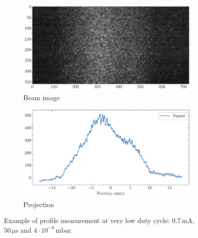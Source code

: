 \begin{figure}[!ht]
  \centering  
  \begin{subfigure}[t]{0.7\textwidth}
    \includegraphics[width=\textwidth]{04_IPHI_Test/figures/fig000_limits_IPHI_a}
    \caption{Beam image}
    \label{chap4:limits_IPHI_a}
  \end{subfigure}

  \begin{subfigure}[t]{0.7\textwidth}
    \includegraphics[width=\textwidth]{04_IPHI_Test/figures/fig000_limits_IPHI_b}
    \caption{Projection}
    \label{chap4:limits_IPHI_b}
  \end{subfigure}
  \caption[Example of profile measurement at very low duty cycle.]{Example of profile measurement at very low duty cycle: $0.7\,\mathrm{mA}$, $50\, \mathrm{\mu s}$ and $4 \cdot 10^{-8}\,\mathrm{mbar}$.}
  \label{chap4:limits_IPHI}
\end{figure}
